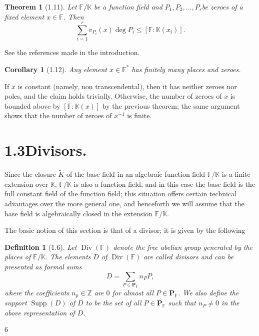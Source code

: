 \documentclass[11pt]{article}
\makeatletter
\theoremstyle{scplain}
\newtheorem*{theorem}{Theorem}
\newtheorem*{corollary}{Corollary}
\newtheorem*{definition}{Definition}
\renewenvironment{proof}[1][\proofname]{%
  \par\pushQED{\qed}\normalfont\topsep6\p@\@plus6\p@\relax
  \trivlist\item[\hskip\labelsep\scshape #1\@addpunct{.}]\ignorespaces}%
  {\popQED\endtrivlist\@endpefalse}
\DeclareMathOperator{\Div}{Div}
\DeclareMathOperator{\Supp}{Supp}
\makeatother
\begin{document}
\begin{theorem}[1.11]
Let $\mathbb{F}/\mathbb{K}$ be a function field and $P_1, P_2, \ldots, P_r$be
zeroes of a fixed element $x \in \mathbb{F}$. Then
\[
  \sum_{i=1}^{r} v_{P_i}(x) \deg P_i \leq [\mathbb{F} : \mathbb{K}(x_i)].
\]
\end{theorem}

\begin{proof}
See the references made in the introduction.
\end{proof}

\begin{corollary}[1.12]
Any element $x \in \mathbb{F}^*$ has finitely many places and zeroes.
\end{corollary}

\begin{proof}
If $x$ is constant (namely, non transcendental), then it has neither zeroes nor
poles, and the claim holds trivially. Otherwise, the number of zeroes of $x$ is
bounded above by $[\mathbb{F} : \mathbb{K}(x)]$ by the previous theorem; the same
argument shows that the number of zeroes of $x^{-1}$ is finite.
\end{proof}

\section*{1.3\quad Divisors.}

\noindent
Since the closure $\tilde{K}$ of the base field in an algebraic function field
$\mathbb{F}/\mathbb{K}$ is a finite extension over $\mathbb{K}$,
$\mathbb{F}/\mathbb{K}$ is also a function field, and in this case the base field
is the full constant field of the function field; this situation offers certain
technical advantages over the more general one, and henceforth we will assume
that the base field is algebraically closed in the extension $\mathbb{F}/\mathbb{K}$.

The basic notion of this section is that of a divisor; it is given by the
following

\begin{definition}[1.6]
Let $\Div(\mathbb{F})$ denote the free abelian group generated by the places of
$\mathbb{F}/\mathbb{K}$. The elements $D$ of $\Div(\mathbb{F})$ are called divisors
and can be presented as formal sums
\[
  D = \sum_{P \in \mathbf{P}_{\mathbb{F}}} n_P P,
\]
where the coefficients $n_p \in \mathbb{Z}$ are $0$ for almost all
$P \in \mathbf{P}_{\mathbb{F}}$. We also define the support $\Supp(D)$ of $D$ to be
the set of all $P \in \mathbf{P}_{\mathbb{F}}$ such that $n_P \neq 0$ in the above
representation of $D$.
\end{definition}

\begin{center}6\end{center}
\end{document}
